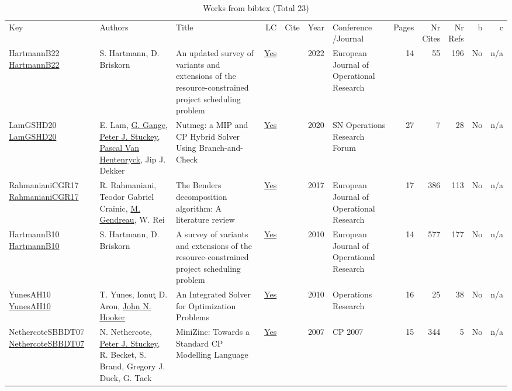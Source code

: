 {\scriptsize
\begin{longtable}{>{\raggedright\arraybackslash}p{3cm}>{\raggedright\arraybackslash}p{6cm}>{\raggedright\arraybackslash}p{6.5cm}rrrp{2.5cm}rrrrr}
\rowcolor{white}\caption{Works from bibtex (Total 23)}\\ \toprule
\rowcolor{white}Key & Authors & Title & LC & Cite & Year & \shortstack{Conference\\/Journal} & Pages & \shortstack{Nr\\Cites} & \shortstack{Nr\\Refs} & b & c \\ \midrule\endhead
\bottomrule
\endfoot
HartmannB22 \href{http://dx.doi.org/10.1016/j.ejor.2021.05.004}{HartmannB22} & S. Hartmann, D. Briskorn & An updated survey of variants and extensions of the resource-constrained project scheduling problem & \href{works/HartmannB22.pdf}{Yes} & \cite{HartmannB22} & 2022 & European Journal of Operational Research & 14 & 55 & 196 & No & n/a\\
LamGSHD20 \href{http://dx.doi.org/10.1007/s43069-020-00023-2}{LamGSHD20} & E. Lam, \hyperref[auth:a187]{G. Gange}, \hyperref[auth:a126]{Peter J. Stuckey}, \hyperref[auth:a149]{Pascal Van Hentenryck}, Jip J. Dekker & Nutmeg: a MIP and CP Hybrid Solver Using Branch-and-Check & \href{works/LamGSHD20.pdf}{Yes} & \cite{LamGSHD20} & 2020 & SN Operations Research Forum & 27 & 7 & 28 & No & n/a\\
RahmanianiCGR17 \href{http://dx.doi.org/10.1016/j.ejor.2016.12.005}{RahmanianiCGR17} & R. Rahmaniani, Teodor Gabriel Crainic, \hyperref[auth:a626]{M. Gendreau}, W. Rei & The Benders decomposition algorithm: A literature review & \href{works/RahmanianiCGR17.pdf}{Yes} & \cite{RahmanianiCGR17} & 2017 & European Journal of Operational Research & 17 & 386 & 113 & No & n/a\\
HartmannB10 \href{http://dx.doi.org/10.1016/j.ejor.2009.11.005}{HartmannB10} & S. Hartmann, D. Briskorn & A survey of variants and extensions of the resource-constrained project scheduling problem & \href{works/HartmannB10.pdf}{Yes} & \cite{HartmannB10} & 2010 & European Journal of Operational Research & 14 & 577 & 177 & No & n/a\\
YunesAH10 \href{http://dx.doi.org/10.1287/opre.1090.0733}{YunesAH10} & T. Yunes, Ionuţ D. Aron, \hyperref[auth:a162]{John N. Hooker} & An Integrated Solver for Optimization Problems & \href{works/YunesAH10.pdf}{Yes} & \cite{YunesAH10} & 2010 & Operations Research & 16 & 25 & 38 & No & n/a\\
NethercoteSBBDT07 \href{https://doi.org/10.1007/978-3-540-74970-7\_38}{NethercoteSBBDT07} & N. Nethercote, \hyperref[auth:a126]{Peter J. Stuckey}, R. Becket, S. Brand, Gregory J. Duck, G. Tack & MiniZinc: Towards a Standard {CP} Modelling Language & \href{works/NethercoteSBBDT07.pdf}{Yes} & \cite{NethercoteSBBDT07} & 2007 & CP 2007 & 15 & 344 & 5 & No & n/a\\

\end{longtable}}
